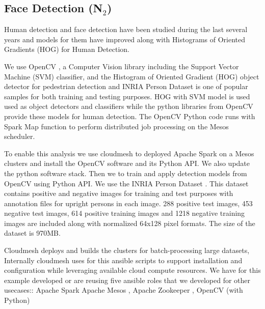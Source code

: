 

\subsection{Face Detection (N$_2$)}


Human detection and face detection have been studied during the last
several years and models for them have improved along with Histograms
of Oriented Gradients (HOG) \cite{??} for Human Detection. 



We use OpenCV \cite{bradski2000opencv}, a Computer Vision library including the
Support Vector Machine (SVM) classifier, and the Histogram of Oriented
Gradient (HOG) \cite{dalal2005histograms}object detector for pedestrian detection and
INRIA Person Dataset is one of popular samples for both training and
testing purposes. HOG with SVM model is used used as object detectors
and classifiers while the python libraries from OpenCV provide these
models for human detection.  The OpenCV Python code runs with Spark
Map function to perform distributed job processing on the Mesos
scheduler.

To enable this analysis we use cloudmesh to deployed Apache Spark on a
Mesos clusters and install the OpenCV software and its Python API. We
also update the python software stack. Then we to train and apply
detection models from OpenCV using Python API. We use the INRIA Person
Dataset \cite{dalal2005inria}. This dataset contains positive and negative images for
training and test purposes with annotation files for upright persons in each
image. 288 positive test images, 453 negative test images, 614 positive
training images and 1218 negative training images are included along with
normalized 64x128 pixel formats. The size of the dataset is 970MB.

Cloudmesh deploys and builds the clusters for batch-processing large
datasets, Internally cloudmesh uses for this ansible scripts to
support installation and configuration while leveraging available
cloud compute resources. We have for this example developed or are
reusing five ansible roles that we developed for other usecases::
Apache Spark \cite{ansible-role-spark}
Apache Mesos \cite{??}, Apache Zookeeper \cite{??}, 
  OpenCV (with Python) \cite{ansible-role-opencv}






